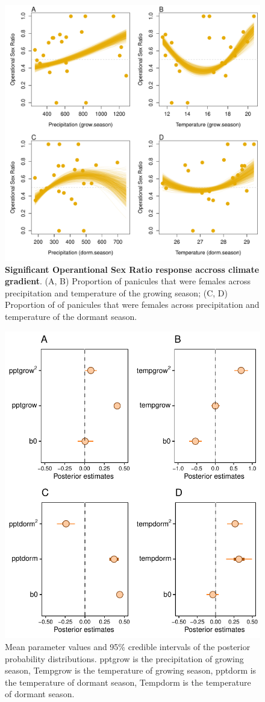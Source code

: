 \documentclass[12pt]{article}
\begin{document}
\begin{figure}[H]
  \begin{center}
    \includegraphics[width=0.80\linewidth]{Figures/gardens_OSR.pdf}
  \caption{\textbf{Significant Operantional Sex Ratio response accross climate gradient}.
  (A, B) Proportion of panicules that were females across precipitation and temperature of the growing season; (C, D) Proportion of of panicules that were females across precipitation and temperature of the dormant season.}
  \label{Sup:gardens_OSR}
  \end{center}
\end{figure}

\begin{figure}[H]
		\centering
		\includegraphics[width=0.75\linewidth]{Figures/Posterior_ORS.pdf}
		\caption{Mean parameter values and 95\% credible intervals of the posterior probability distributions. 
		pptgrow is  the precipitation of growing season,
		Tempgrow is the temperature of growing season,
		pptdorm is the temperature of dormant season,
		Tempdorm is the temperature of dormant season.}
		\label{Sup:PosteriorOSR}
\end{figure}
\end{document}
